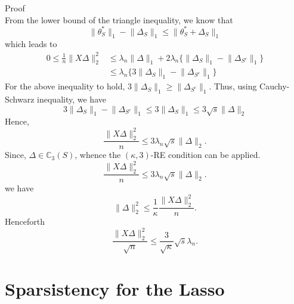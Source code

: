 \documentclass[10pt,handout,english]{beamer}
\begin{document}
\begin{frame}[allowframebreaks]{Proof}
\[\] 
From the lower bound of the triangle inequality, we know that
\[
\lVert\theta_S^*\rVert_1-\lVert\Delta_S\rVert_1\leq\lVert\theta_S^*+\Delta_S\rVert_1 
\]
which leads to
\begin{align*}
0\leq \frac{1}{n}\lVert X\Delta \rVert_2^2&\leq \lambda_n\lVert\Delta\rVert_1+2\lambda_n\{\lVert\Delta_S\rVert_1-\lVert\Delta_{S^c}\rVert_1\}\\
&\leq\lambda_n\{3\lVert\Delta_S\rVert_1-\lVert\Delta_{S^c}\rVert_1\}
\end{align*}
For the above inequality to hold, $3\lVert\Delta_S\rVert_1\geq \lVert\Delta_{S^c}\rVert_1$. Thus, using Cauchy-Schwarz inequality, we have
\[
3\lVert\Delta_S\rVert_1-\lVert\Delta_{S^c}\rVert_1\leq 3\lVert\Delta_S\rVert_1\leq 3\sqrt{s}\lVert\Delta\rVert_2
\]
Hence, 
\[
\frac{\lVert X\Delta\rVert_2^2}{n}\leq 3\lambda_n\sqrt{s}\lVert\Delta\rVert_2. 
\]
Since, $\Delta\in\mathbb{C}_3(S)$, whence the $(\kappa,3)$-RE condition can be applied. 
\[
\frac{\lVert X\Delta\rVert_2^2}{n}\leq 3\lambda_n\sqrt{s}\lVert\Delta\rVert_2. 
\]
we have
\[
\lVert\Delta\rVert_2^2\leq\frac{1}{\kappa}\frac{\lVert X\Delta\rVert_2^2}{n}. 
\]
Henceforth
\[
\frac{\lVert X\Delta\rVert_2^2}{\sqrt{n}}\leq \frac{3}{\sqrt{\kappa}}\sqrt{s}\lambda_n	. 
\]
\end{frame}
\section{Sparsistency for the Lasso}
\end{document}
